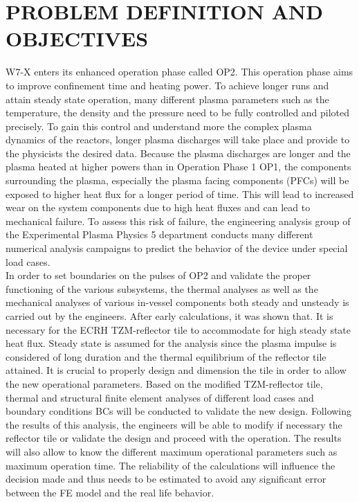\section{PROBLEM DEFINITION AND OBJECTIVES}
{\small W7-X enters its enhanced operation phase called \acrshort{OP2}. This operation phase aims to improve confinement time and heating power. To achieve longer runs and attain steady state operation, many different plasma parameters such as the temperature, the density and the pressure need to be fully controlled and piloted precisely. To gain this control and understand more the complex plasma dynamics of the reactors, longer plasma discharges will take place and provide to the physicists the desired data. Because the plasma discharges are longer and the plasma heated at higher powers than in Operation Phase 1 \acrshort{OP1}, the components surrounding the plasma, especially the plasma facing components (\acrshort{PFCs}) will be exposed to higher heat flux for a longer period of time. This will lead to increased wear on the system components due to high heat fluxes and can lead to mechanical failure. To assess this risk of failure, the engineering analysis group of the Experimental Plasma Physics 5 department conducts many different numerical analysis campaigns to predict the behavior of the device under special load cases.}
\\
\break
\small{\indent In order to set boundaries on the pulses of \acrshort{OP2} and validate the proper functioning of the various subsystems, the thermal analyses as well as the mechanical analyses of various in-vessel components both steady and unsteady is carried out by the engineers. After early calculations, it was shown that. It is necessary for the ECRH TZM-reflector tile to accommodate for high steady state heat flux. Steady state is assumed for the analysis since the plasma impulse is considered of long duration and the thermal equilibrium of the reflector tile attained. It is crucial to properly design and dimension the tile in order to allow the new operational parameters. Based on the modified TZM-reflector tile, thermal and structural finite element analyses of different load cases and boundary conditions \acrshort{BCs} will be conducted to validate the new design. Following the results of this analysis, the engineers will be able to modify if necessary the reflector tile or validate the design and proceed with the operation. The results will also allow to know the different maximum operational parameters such as maximum operation time. The reliability of the calculations will influence the decision made and thus needs to be estimated to avoid any significant error between the FE model and the real life behavior.}
